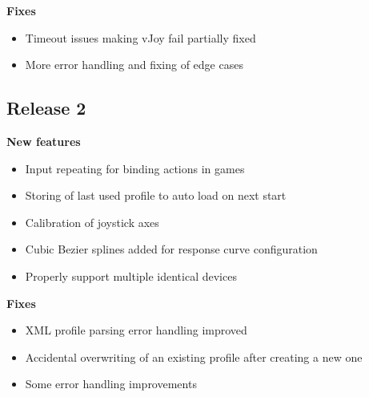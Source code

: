 \documentclass[a4, 10pt]{article}
\begin{document}
\textbf{Fixes}
\begin{itemize}
    \item Timeout issues making vJoy fail partially fixed
    \item More error handling and fixing of edge cases
\end{itemize}


\subsection{Release 2}

\textbf{New features}
\begin{itemize}
    \item Input repeating for binding actions in games
    \item Storing of last used profile to auto load on next start
    \item Calibration of joystick axes
    \item Cubic Bezier splines added for response curve configuration
    \item Properly support multiple identical devices
\end{itemize}

\noindent \textbf{Fixes}
\begin{itemize}
    \item XML profile parsing error handling improved
    \item Accidental overwriting of an existing profile after creating a
        new one
    \item Some error handling improvements
\end{itemize}



%
%
\end{document}
